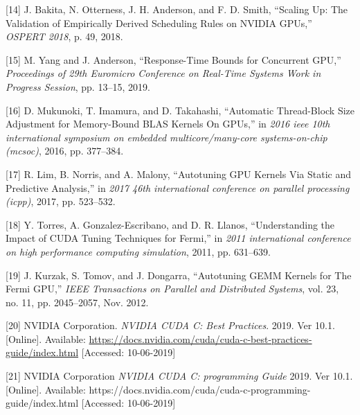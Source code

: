 \documentclass[
  12pt,
  a4paperpaper,
]{report}
\begin{document}
\leavevmode\hypertarget{ref-bakita2018scaling}{}%
{[}14{]} J. Bakita, N. Otterness, J. H. Anderson, and F. D. Smith,
``Scaling Up: The Validation of Empirically Derived Scheduling Rules on
NVIDIA GPUs,'' \emph{OSPERT 2018}, p. 49, 2018.

\leavevmode\hypertarget{ref-yang2019}{}%
{[}15{]} M. Yang and J. Anderson, ``Response-Time Bounds for Concurrent
GPU,'' \emph{Proceedings of 29th Euromicro Conference on Real-Time
Systems Work in Progress Session}, pp. 13--15, 2019.

\leavevmode\hypertarget{ref-Mukunoki2016}{}%
{[}16{]} D. Mukunoki, T. Imamura, and D. Takahashi, ``Automatic
Thread-Block Size Adjustment for Memory-Bound BLAS Kernels On GPUs,'' in
\emph{2016 ieee 10th international symposium on embedded
multicore/many-core systems-on-chip (mcsoc)}, 2016, pp. 377--384.

\leavevmode\hypertarget{ref-Lim2017}{}%
{[}17{]} R. Lim, B. Norris, and A. Malony, ``Autotuning GPU Kernels Via
Static and Predictive Analysis,'' in \emph{2017 46th international
conference on parallel processing (icpp)}, 2017, pp. 523--532.

\leavevmode\hypertarget{ref-Torres2011}{}%
{[}18{]} Y. Torres, A. Gonzalez-Escribano, and D. R. Llanos,
``Understanding the Impact of CUDA Tuning Techniques for Fermi,'' in
\emph{2011 international conference on high performance computing
simulation}, 2011, pp. 631--639.

\leavevmode\hypertarget{ref-Kurzak2012}{}%
{[}19{]} J. Kurzak, S. Tomov, and J. Dongarra, ``Autotuning GEMM Kernels
for The Fermi GPU,'' \emph{IEEE Transactions on Parallel and Distributed
Systems}, vol. 23, no. 11, pp. 2045--2057, Nov. 2012.

\leavevmode\hypertarget{ref-CCUDA20192}{}%
{[}20{]} NVIDIA Corporation. \emph{NVIDIA CUDA C: Best Practices}. 2019. Ver 10.1. [Online]. Available: \url{https://docs.nvidia.com/cuda/cuda-c-best-practices-guide/index.html} [Accessed: 10-06-2019]  


\leavevmode\hypertarget{ref-CCUDA2019}{}%
{[}21{]} NVIDIA Corporation \emph{NVIDIA CUDA C: programming Guide}  2019. Ver 10.1. [Online]. Available: \url{}https://docs.nvidia.com/cuda/cuda-c-programming-guide/index.html [Accessed: 10-06-2019]  
\end{document}
